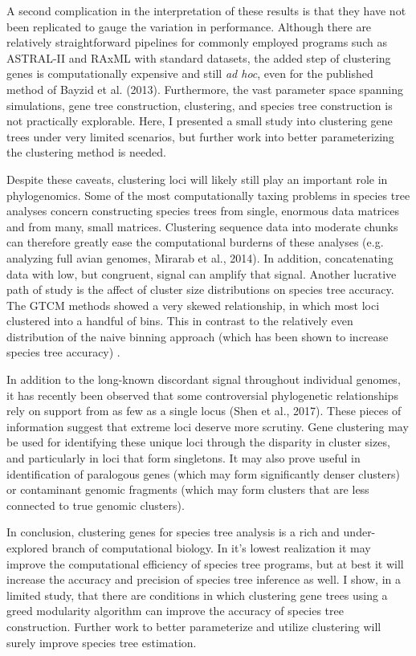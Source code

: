 \documentclass[11pt]{article}
\begin{document}
A second complication in the interpretation of these results is that
they have not been replicated to gauge the variation in performance.
Although there are relatively straightforward pipelines for commonly
employed programs such as ASTRAL-II and RAxML with standard datasets,
the added step of clustering genes is computationally expensive and
still \emph{ad hoc}, even for the published method of Bayzid et al.
(2013). Furthermore, the vast parameter space spanning simulations, gene
tree construction, clustering, and species tree construction is not
practically explorable. Here, I presented a small study into clustering
gene trees under very limited scenarios, but further work into better
parameterizing the clustering method is needed.

Despite these caveats, clustering loci will likely still play an
important role in phylogenomics. Some of the most computationally taxing
problems in species tree analyses concern constructing species trees
from single, enormous data matrices and from many, small matrices.
Clustering sequence data into moderate chunks can therefore greatly ease
the computational burderns of these analyses (e.g. analyzing full avian
genomes, Mirarab et al., 2014). In addition, concatenating data with
low, but congruent, signal can amplify that signal. Another lucrative
path of study is the affect of cluster size distributions on species
tree accuracy. The GTCM methods showed a very skewed relationship, in
which most loci clustered into a handful of bins. This in contrast to
the relatively even distribution of the naive binning approach (which
has been shown to increase species tree accuracy) .

In addition to the long-known discordant signal throughout individual
genomes, it has recently been observed that some controversial
phylogenetic relationships rely on support from as few as a single locus
(Shen et al., 2017). These pieces of information suggest that extreme
loci deserve more scrutiny. Gene clustering may be used for identifying
these unique loci through the disparity in cluster sizes, and
particularly in loci that form singletons. It may also prove useful in
identification of paralogous genes (which may form significantly denser
clusters) or contaminant genomic fragments (which may form clusters that
are less connected to true genomic clusters).

In conclusion, clustering genes for species tree analysis is a rich and
under-explored branch of computational biology. In it's lowest
realization it may improve the computational efficiency of species tree
programs, but at best it will increase the accuracy and precision of
species tree inference as well. I show, in a limited study, that there
are conditions in which clustering gene trees using a greed modularity
algorithm can improve the accuracy of species tree construction. Further
work to better parameterize and utilize clustering will surely improve
species tree estimation.
\end{document}
